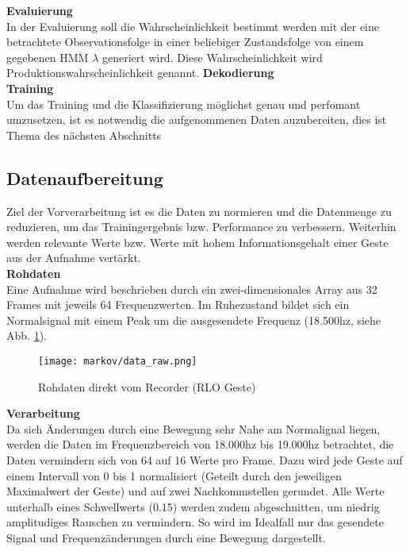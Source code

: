\textbf{Evaluierung} \\
In der Evaluierung soll die Wahrscheinlichkeit bestimmt werden mit der eine
betrachtete Observationsfolge in einer beliebiger Zustandsfolge von einem
gegebenen \acl{HMM} \(\lambda\) generiert wird. Diese Wahrscheinlichkeit wird
Produktionswahrscheinlichkeit genannt. 
\textbf{Dekodierung}
\\
\textbf{Training} \\

Um das Training und die Klassifizierung möglichst genau und perfomant umzusetzen, 
ist es notwendig die aufgenommenen Daten auzubereiten, dies ist Thema des nächsten Abschnitts


\subsection{Datenaufbereitung} \label{sec:preproc}
Ziel der Vorverarbeitung ist es die Daten zu normieren und die Datenmenge zu reduzieren, um das Trainingergebnis bzw. Performance zu verbessern.
Weiterhin werden relevante Werte bzw. Werte mit hohem Informationsgehalt einer Geste aus der Aufnahme vertärkt. \\


\textbf{Rohdaten} \\
Eine Aufnahme wird beschrieben durch ein zwei-dimensionales Array aus 32 Frames mit jeweils 64 Frequenzwerten.
Im Ruhezustand bildet sich ein Normalsignal mit einem Peak um die ausgesendete Frequenz (18.500hz, siehe Abb. \ref{fig:data_raw}).

\begin{figure}[htbp] \centering
    \texttt{[image: markov/data\_raw.png]}
    \caption{Rohdaten direkt vom Recorder (\acl{RLO} Geste)}
    \label{fig:data_raw}
\end{figure}

\textbf{Verarbeitung}\\
Da sich Änderungen durch eine Bewegung sehr Nahe am Normalignal liegen, werden die Daten im 
Frequenzbereich von 18.000hz bis 19.000hz betrachtet, die Daten vermindern sich von 64 auf 16 Werte pro Frame. 
Dazu wird jede Geste auf einem Intervall von 0 bis 1 normalisiert (Geteilt durch den jeweiligen Maximalwert der Geste) und 
auf zwei Nachkommstellen gerundet. 
Alle Werte unterhalb eines Schwellwerts (0.15) werden zudem abgeschnitten, um niedrig amplitudiges Rauschen zu vermindern. 
So wird im Idealfall nur das gesendete Signal und Frequenzänderungen durch eine Bewegung dargestellt.

